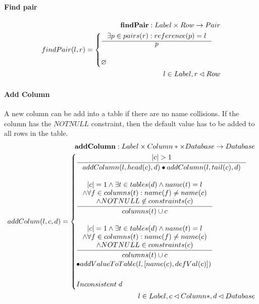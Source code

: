 \documentclass[11pt]{article}
\begin{document}
\paragraph{Find pair}
\begin{align*}
\mathbf{findPair} : Label \times Row \rightarrow Pair \\
	findPair(l, r) = \begin{cases}
		\inference{\exists p \in pairs(r) : reference(p) = l}{p} \\ \\
			\varnothing
		\end{cases}\\
		l \in Label, r \lhd Row
\end{align*}

\paragraph{Add Column} A new column can be add into a table if there are no name collisions. If the column has the $NOTNULL$ constraint, then the default value has to be added to all rows in the table.
\begin{align*}
	\mathbf{addColumn} : Label \times Column* \times Database \rightarrow Database \\ 	
	addColum(l, c, d) = \begin{cases}
		\inference{|c| > 1}{addColumn(l, head(c), d) \bullet addColumn(l, tail(c), d)} \\ \\
		\inference{|c| = 1 \wedge \exists t \in tables(d) \wedge name(t) = l \\ \wedge \forall f \in columns(t) : name(f) \neq name(c) \\ \wedge NOTNULL \not \in constraints(c) }{columns(t) \cup c}\\ \\
		\inference{|c| = 1 \wedge \exists t \in tables(d) \wedge name(t) = l \\ \wedge \forall f \in columns(t) : name(f) \neq name(c) \\ \wedge NOTNULL \in constraints(c) }{columns(t) \cup c}\\ \bullet addValueToTable(l, [name(c), defVal(c)]) \\ \\
		Inconsistent \;d 
	 \end{cases}\\ 
	 l \in Label, c \lhd Column*,d \lhd Database
\end{align*}
\end{document}
